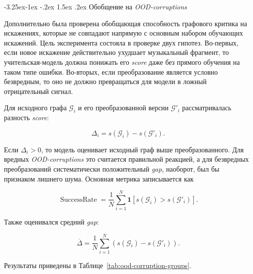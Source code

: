 \documentclass[a4paper,12pt]{extarticle}
\makeatletter
\renewcommand\subsubsection{\@startsection{subsubsection}{3}{\z@}%
  {-3.25ex\@plus -1ex \@minus -.2ex}%
  {1.5ex \@plus .2ex}%
  {\normalfont\normalsize\bfseries\Needspace{5\baselineskip}}}
\makeatother
\begin{document}
\subsubsection{Обобщение на \textit{OOD-corruptions}}

Дополнительно была проверена обобщающая способность графового критика на искажениях, которые не совпадают напрямую с основным набором обучающих искажений. Цель эксперимента состояла в проверке двух гипотез. Во-первых, если новое искажение действительно ухудшает музыкальный фрагмент, то учительская-модель должна понижать его \textit{score} даже без прямого обучения на таком типе ошибки. Во-вторых, если преобразование является условно безвредным, то оно не должно превращаться для модели в ложный отрицательный сигнал.

Для исходного графа $\mathcal{G}_i$ и его преобразованной версии $\mathcal{G}'_i$ рассматривалась разность \textit{score}:

\[
\Delta_i=s(\mathcal{G}_i)-s(\mathcal{G}'_i).
\]

Если $\Delta_i>0$, то модель оценивает исходный граф выше преобразованного. Для вредных \textit{OOD-corruptions} это считается правильной реакцией, а для безвредных преобразований систематически положительный \textit{gap}, наоборот, был бы признаком лишнего шума. Основная метрика записывается как

\[
\operatorname{SuccessRate}=
\frac{1}{N}
\sum_{i=1}^{N}
\mathbf{1}\!\left[s(\mathcal{G}_i)>s(\mathcal{G}'_i)\right].
\]

Также оценивался средний \textit{gap}:

\[
\overline{\Delta}=
\frac{1}{N}
\sum_{i=1}^{N}
\left(s(\mathcal{G}_i)-s(\mathcal{G}'_i)\right).
\]

Результаты приведены в Таблице~\ref{tab:ood-corruption-groups}.

\begin{table}[htbp]
\caption{Проверка обобщения \textit{teacher}-модели на \textit{OOD-corruptions}}
\label{tab:ood-corruption-groups}
\centering
\footnotesize
{}
\end{table}
\end{document}
